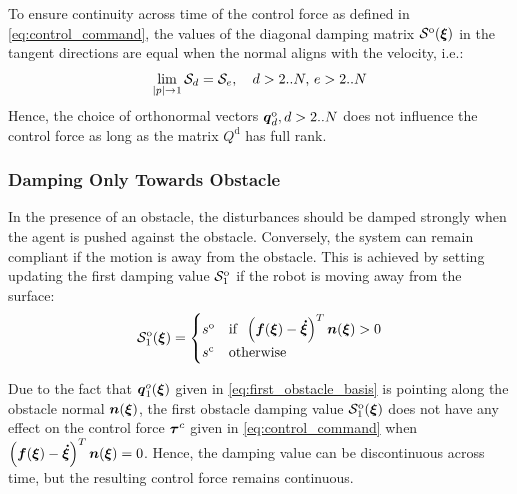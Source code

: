 To ensure continuity across time of the control force as defined in \eqref{eq:control_command}, the values of the diagonal damping matrix  $\mathcal{S}^{\mathrm{o}}(\boldsymbol{\xi})$ in the tangent directions are equal when the normal aligns with the velocity, i.e.:
\begin{equation}
    \lim_{| p | \rightarrow 1} \mathcal{S}_d = \mathcal{S}_e, 
    \quad d > 2 .. N, \, e > 2 .. N
\end{equation}
Hence, the choice of orthonormal vectors $\boldsymbol{q}_d^{\mathrm{o}}, d > 2 .. N$ does not influence the control force as long as the matrix $Q^{\mathrm{d}}$ has full rank.


\subsubsection{Damping Only Towards Obstacle} \label{sec:damping_only_toward}
In the presence of an obstacle, the disturbances should be damped strongly when the agent is pushed against the obstacle. Conversely, the system can remain compliant if the motion is away from the obstacle. This is achieved by setting updating the first damping value $\mathcal{S}^{\mathrm{o}}_1$ if the robot is moving away from the surface:
\begin{equation}
  \matd{S}_1^{\mathrm{o}} (\vecs \xi) =
  \begin{cases}
    s^{\mathrm{o}} & \text{if} \;\; \left(\vect f(\vecs \xi) - \vecs{\dot \xi} \right)^T \vecs n(\vect \xi) > 0 \\
    s^{\mathrm{c}} & \text{otherwise}
  \end{cases}
  \label{eq:leaving_compliance}
\end{equation}

Due to the fact that $\boldsymbol{q}_1^o(\boldsymbol{\xi})$ given in \eqref{eq:first_obstacle_basis} is pointing along the obstacle normal $\boldsymbol{n}(\boldsymbol{\xi})$, the first obstacle damping value $\mathcal{S}_1^{\mathrm{o}} (\boldsymbol{\xi})$ does not have any effect on the control force $\boldsymbol{\tau}^c$ given in \eqref{eq:control_command} when $\left(\boldsymbol{f}(\boldsymbol{\xi}) -  \boldsymbol{\dot \xi} \right)^T \boldsymbol{n}(\boldsymbol{\xi}) = 0$.
Hence, the damping value can be discontinuous across time, but the resulting control force remains continuous.



